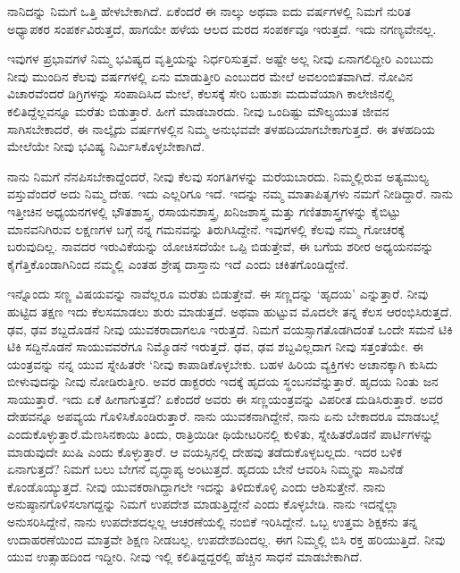 ನಾನಿದನ್ನು ನಿಮಗೆ ಒತ್ತಿ ಹೇಳಬೇಕಾಗಿದೆ. ಏಕೆಂದರೆ ಈ ನಾಲ್ಕು ಅಥವಾ ಐದು ವರ್ಷಗಳಲ್ಲಿ ನಿಮಗೆ ನುರಿತ ಅಧ್ಯಾಪಕರ ಸಂಪರ್ಕವಿರುತ್ತದೆ, ಹಾಗಯೇ ಹಳೆಯ ಆಲದ ಮರದ ಸಂಪರ್ಕವೂ ಇರುತ್ತದೆ. ಇದು ನಗಣ್ಯವೇನಲ್ಲ.

ಇವುಗಳ ಪ್ರಭಾವಗಳೆ ನಿಮ್ಮ ಭವಿಷ್ಯದ ವೃತ್ತಿಯನ್ನು ನಿರ್ಧರಿಸುತ್ತವೆ. ಅಷ್ಟೇ ಅಲ್ಲ ನೀವು ಏನಾಗಲಿದ್ದೀರಿ ಎಂಬುದು ನೀವು ಮುಂದಿನ ಕೆಲವು ವರ್ಷಗಳಲ್ಲಿ ಏನು ಮಾಡುತ್ತೀರಿ ಎಂಬುದರ ಮೇಲೆ ಅವಲಂಬಿತವಾಗಿದೆ. ನೋವಿನ ವಿಚಾರವೆಂದರೆ ಡಿಗ್ರಿಗಳನ್ನು ಸಂಪಾದಿಸಿದ ಮೇಲೆ, ಕೆಲಸಕ್ಕೆ ಸೇರಿ ಬಹುಶಃ ಮದುವೆಯಾಗಿ ಕಾಲೇಜಿನಲ್ಲಿ ಕಲಿತಿದ್ದೆಲ್ಲವನ್ನೂ ಮರೆತು ಬಿಡುತ್ತಾರೆ. ಹೀಗೆ ಮಾಡಬಾರದು. ನೀವು ಒಂದಿಷ್ಟು ಮೌಲ್ಯಯುತ ಜೀವನ ಸಾಗಿಸಬೇಕಾದರೆ, ಈ ನಾಲ್ಕೈದು ವರ್ಷಗಳಲ್ಲಿನ ನಿಮ್ಮ ಅನುಭವವೇ ತಳಹದಿಯಾಗಬೇಕಾಗುತ್ತದೆ. ಈ ತಳಹದಿಯ ಮೇಲೆಯೇ ನೀವು ಭವಿಷ್ಯ ನಿರ್ಮಿಸಿಕೊಳ್ಳಬೇಕಾಗಿದೆ.

ನಾನು ನಿಮಗೆ ನೆನಪಿಸಬೇಕಾದ್ದೆಂದರೆ, ನೀವು ಕೆಲವು ಸಂಗತಿಗಳನ್ನು ಮರೆಯಬಾರದು. ನಿಮ್ಮಲ್ಲಿರುವ ಅತ್ಯಮುಲ್ಯ ವಸ್ತುವೆಂದರೆ ಅದು ನಿಮ್ಮ ದೇಹ. ಇದು ಎಲ್ಲರಿಗೂ ಇದೆ. ಇದನ್ನು ನಮ್ಮ ಮಾತಾಪಿತೃಗಳು ನಮಗೆ ನೀಡಿದ್ದಾರೆ. ನಾನು ಇತ್ತೀಚಿನ ಅಧ್ಯಯನಗಳಲ್ಲಿ ಭೌತಶಾಸ್ತ್ರ, ರಸಾಯನಶಾಸ್ತ್ರ, ಖನಿಜಶಾಸ್ತ್ರ ಮತ್ತು ಗಣಿತಶಾಸ್ತ್ರಗಳನ್ನು ಕೈಬಿಟ್ಟು ಮಾನವನಿಗಿರುವ ಲಕ್ಷಣಗಳ ಬಗ್ಗೆ ನನ್ನ ಗಮನವನ್ನು ತಿರುಗಿಸಿದ್ದೇನೆ. ಇವುಗಳಲ್ಲಿ ಕೆಲವು ನಮ್ಮ ಗೋಚರಕ್ಕೆ ಬರುವುದಿಲ್ಲ. ನಾವದರ ಇರುವಿಕೆಯನ್ನು ಯೋಚಿಸದೆಯೇ ಒಪ್ಪಿ ಬಿಡುತ್ತೇವೆ, ಈ ಬಗೆಯ ಶರೀರ ಅಧ್ಯಯನವನ್ನು ಕೈಗೆತ್ತಿಕೊಂಡಾಗಿನಿಂದ ನಮ್ಮಲ್ಲಿ ಎಂತಹ ಶ್ರೇಷ್ಠ ದಾಸ್ತಾನು ಇದೆ ಎಂದು ಚಕಿತಗೊಂಡಿದ್ದೇನೆ.

ಇನ್ನೊಂದು ಸಣ್ಣ ವಿಷಯವನ್ನು ನಾವೆಲ್ಲರೂ ಮರೆತು ಬಿಡುತ್ತೇವೆ. ಈ ಸಣ್ಣದನ್ನು ‘ಹೃದಯ’ ಎನ್ನುತ್ತಾರೆ. ನೀವು ಹುಟ್ಟಿದ ತಕ್ಷಣ ಇದು ಕೆಲಸಮಾಡಲು ಶುರು ಮಾಡುತ್ತದೆ. ಅಥವಾ ಹುಟ್ಟುವ ಮೊದಲೇ ತನ್ನ ಕೆಲಸ ಆರಂಭಿಸಿರುತ್ತದೆ. ಢವ, ಢವ ಶಬ್ದದೊಡನೆ ನೀವು ಯುವಕರಾದಾಗಲೂ ಇರುತ್ತದೆ. ನಿಮಗೆ ವಯಸ್ಸಾಗತೊಡಗಿದಂತೆ ಒಂದೇ ಸಮನೆ ಟಿಕಿ ಟಿಕಿ ಸದ್ದಿನೊಡನೆ ಸಾಯುವವರೆಗೂ ನಿಮ್ಮೊಡನೆ ಇರುತ್ತದೆ. ಢವ, ಢವ ಶಬ್ದವಿಲ್ಲದಾಗ ನೀವು ಸತ್ತಂತೆಯೇ. ಈ ಯಂತ್ರವನ್ನು ನನ್ನ ಯುವ ಸ್ನೇಹಿತರೇ \enginline{--} ‘ನೀವು ಕಾಪಾಡಿಕೊಳ್ಳಬೇಕು. ಬಹಳ ಹಿರಿಯ ವ್ಯಕ್ತಿಗಳು ಅಚಾನಕ್ಕಾಗಿ ಕುಸಿದು ಬೀಳುವುದನ್ನು ನೀವು ನೋಡಿರುತ್ತೀರಿ. ಅವರ ಡಾಕ್ಟರರು ಇದಕ್ಕೆ ಹೃದಯ ಸ್ಥಂಬನವೆನ್ನುತ್ತಾರೆ. ಹೃದಯ ನಿಂತು ಜನ ಸಾಯುತ್ತಾರೆ. ಇದು ಏಕೆ ಹೀಗಾಗುತ್ತದೆ? ಏಕೆಂದರೆ ಅವರು ಈ ಸಣ್ಣಯಂತ್ರವನ್ನು ವಿಪರೀತ ದುಡಿಸಿರುತ್ತಾರೆ. ಅವರ ದೇಹವನ್ನೂ ಅಪವ್ಯಯ ಗೊಳಿಸಿಕೊಂಡಿರುತ್ತಾರೆ. ನಾನು ಯುವಕನಾಗಿದ್ದೇನೆ, ನಾನು ಏನು ಬೇಕಾದರೂ ಮಾಡಬಲ್ಲೆ ಎಂದುಕೊಳ್ಳುತ್ತಾರೆ.\break ಮೆಣಸಿನಕಾಯಿ ತಿಂದು, ರಾತ್ರಿಯಿಡೀ ಥಿಯೇಟರಿನಲ್ಲಿ ಕುಳಿತು, ಸ್ನೇಹಿತರೊಡನೆ ಪಾರ್ಟಿಗಳನ್ನು ಮಾಡುವುದೇ ಖುಷಿ ಎಂದು ಕೊಳ್ಳುತ್ತಾರೆ. ಆ ವಯಸ್ಸಿನಲ್ಲಿ ದೇಹವು ತಡೆದುಕೊಳ್ಳಬಲ್ಲದು. ಇದರ ಬಳಿಕ ಏನಾಗುತ್ತದೆ? ನಿಮಗೆ ಬಲು ಬೇಗನೆ ವೃದ್ಧಾಪ್ಯ ಅಂಟುತ್ತದೆ. ಹೃದಯ ಬೇನೆ ಆವರಿಸಿ ನಿಮ್ಮನ್ನು ಸಾವಿನೆಡೆ ಕೊಂಡೊಯ್ಯುತ್ತದೆ. ನೀವು ಯುವಕರಾಗಿದ್ದಾಗಲೇ ಇದನ್ನು ತಿಳಿದುಕೊಳ್ಳಿ ಎಂದು ಆಶಿಸುತ್ತೇನೆ. ನಾನು ಅನುಷ್ಠಾನಗೊಳಿಸಲಾಗದ್ದನ್ನು ನಿಮಗೆ ಉಪದೇಶ ಮಾಡುತ್ತಿದ್ದೇನೆ ಎಂದು ಕೊಳ್ಳಬೇಡಿ. ನಾನು ಇದನ್ನೆಲ್ಲಾ ಅನುಸರಿಸಿದ್ದೇನೆ, ನಾನು ಉಪದೇಶದಲ್ಲಲ್ಲ \enginline{--} ಆಚರಣೆಯಲ್ಲಿ ನಂಬಿಕೆ ಇರಿಸಿದ್ದೇನೆ. ಒಬ್ಬ ಉತ್ತಮ ಶಿಕ್ಷಕನು ತನ್ನ ಉದಾಹರಣೆಯಿಂದ ಮಾತ್ರವೇ ಶಿಕ್ಷಣ ನೀಡಬಲ್ಲ. ಉಪದೇಶದಿಂದಲ್ಲ. ಈಗ ನಿಮ್ಮಲ್ಲಿ ಬಿಸಿ ರಕ್ತ ಹರಿಯುತ್ತಿದೆ. ನೀವು ಯುವ ಉತ್ಸಾಹದಿಂದ ಇದ್ದೀರಿ. ನೀವು ಇಲ್ಲಿ ಕಲಿತಿದ್ದದ್ದರಲ್ಲಿ ಹೆಚ್ಚಿನ ಸಾಧನೆ ಮಾಡಬೇಕಾಗಿದೆ.

